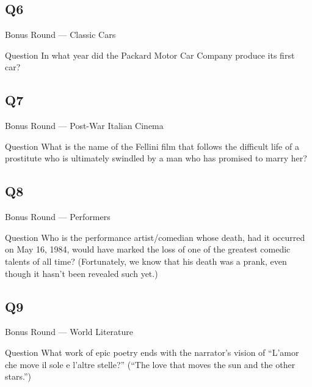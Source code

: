 \documentclass[11pt]{beamer}
\begin{document}
\subsection*{Q6}
\begin{frame}[t]{Bonus Round --- Classic Cars }
\vspace{-0.5em}
\begin{block}{Question}
In what year did the Packard Motor Car Company produce its first car?
\end{block}
\end{frame}
\subsection*{Q7}
\begin{frame}[t]{Bonus Round --- Post-War Italian Cinema}
\vspace{-0.5em}
\begin{block}{Question}
What is the name of the Fellini film that follows the difficult life of a prostitute who is ultimately swindled by a man who has promised to marry her?
\end{block}
\end{frame}
\subsection*{Q8}
\begin{frame}[t]{Bonus Round --- Performers}
\vspace{-0.5em}
\begin{block}{Question}
Who is the performance artist/comedian whose death, had it occurred on May 16, 1984, would have marked the loss of one of the greatest comedic talents of all time? (Fortunately, we know that his death was a prank, even though it hasn't been revealed such yet.)
\end{block}
\end{frame}
\subsection*{Q9}
\begin{frame}[t]{Bonus Round --- World Literature}
\vspace{-0.5em}
\begin{block}{Question}
What work of epic poetry ends with the narrator's vision of ``L'amor che move il sole e l'altre stelle?'' (``The love that moves the sun and the other stars.'')
\end{block}
\end{frame}
\end{document}
